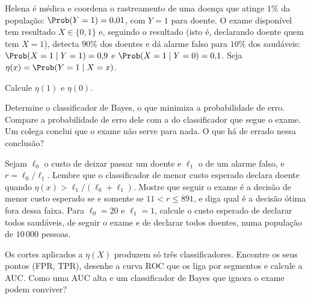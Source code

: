 Helena é médica e coordena o rastreamento de uma doença que atinge $1\%$ da população:
$\Prob(Y=1)=0{,}01$, com $Y=1$ para doente. O exame disponível tem resultado $X\in\{0,1\}$ e,
seguindo o resultado (isto é, declarando doente quem tem $X=1$), detecta $90\%$ dos doentes
e dá alarme falso para $10\%$ dos saudáveis:
$\Prob(X=1\mid Y=1)=0{,}9$ e $\Prob(X=1\mid Y=0)=0{,}1$. Seja
$\eta(x)=\Prob(Y=1\mid X=x)$.
\begin{itens}
  \item {} Calcule $\eta(1)$ e $\eta(0)$.
  \item {} Determine o classificador de Bayes, o que minimiza a probabilidade de erro.
        Compare a probabilidade de erro dele com a do classificador que segue o exame. Um
        colega conclui que o exame não serve para nada. O que há de errado nessa conclusão?
  \item {} Sejam $\ell_0$ o custo de deixar passar um doente e $\ell_1$ o de um alarme
        falso, e $r=\ell_0/\ell_1$. Lembre que o classificador de menor custo esperado declara
        doente quando $\eta(x)>\ell_1/(\ell_0+\ell_1)$. Mostre que seguir o exame é a decisão
        de menor custo esperado se e somente se $11<r\le891$, e diga qual é a decisão ótima
        fora dessa faixa. Para $\ell_0=20$ e $\ell_1=1$, calcule o custo esperado de declarar
        todos saudáveis, de seguir o exame e de declarar todos doentes, numa população de
        $10\,000$ pessoas.
  \item {} Os cortes aplicados a $\eta(X)$ produzem só três classificadores. Encontre
        os seus pontos (FPR, TPR), desenhe a curva ROC que os liga por segmentos e calcule a
        AUC. Como uma AUC alta e um classificador de Bayes que ignora o exame podem conviver?
\end{itens}

